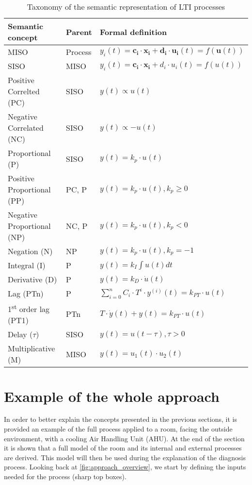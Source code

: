 \begin{table}
  \centering
  \caption{Taxonomy of the semantic representation of LTI processes}
  \label{tab:lti_taxonomy}

  \begin{tabular}{lll}\hline
    \textbf{Semantic concept} & \textbf{Parent} & \textbf{Formal definition} \\\hline
    MISO & Process & $y_i(t)=\mathbf{c_i}\cdot \mathbf{x_i}+\mathbf{d_i}\cdot \mathbf{u_i}(t)=f(\mathbf{u}(t))$ \\\hline
    SISO & MISO & $y_i(t)=\mathbf{c_i}\cdot \mathbf{x_i}+d_i\cdot u_i(t)=f(u(t))$ \\\hline
    Positive Correlted (PC) & SISO & $y(t)\propto u(t)$ \\
    Negative Correlated (NC) & SISO & $y(t)\propto -u(t)$ \\
    Proportional (P) & SISO & $y(t)=k_p\cdot u(t)$ \\
    Positive Proportional (PP) & PC, P & $y(t)=k_p\cdot u(t), k_p\geq 0$\\
    Negative Proportional (NP) & NC, P & $y(t)=k_p\cdot u(t), k_p<0$\\
    Negation (N) & NP & $y(t)=k_p\cdot u(t), k_p=-1$\\
    Integral (I) & P & $y(t)=k_I\int u(t)dt$\\
    Derivative (D) & P & $y(t)=k_D\cdot\dot u(t)$\\
    Lag (PTn) & P & $\sum_{i=0}^{n}C_i\cdot T^i \cdot y^{(i)}(t)=k_{PT}\cdot u(t) $\\
    1\textsuperscript{st} order lag (PT1) & PTn & $T\cdot\dot y(t)+y(t)=k_{PT}\cdot u(t)$\\
    Delay ($\tau$) & SISO & $y(t)=u(t-\tau), \tau>0$\\
    Multiplicative (M) & MISO & $y(t)=u_1(t)\cdot u_2(t)$
  \end{tabular}
\end{table}

\section{Example of the whole approach}
In order to better explain the concepts presented in the previous sections, it is provided an example of the full process applied to a room, facing the outside environment, with a cooling Air Handling Unit (AHU). At the end of the section it is shown that a full model of the room and its internal and external processes are derived. This model will then be used during the explanation of the diagnosis process. Looking back at \autoref{fig:approach_overview}, we start by defining the inputs needed for the process (sharp top boxes).
